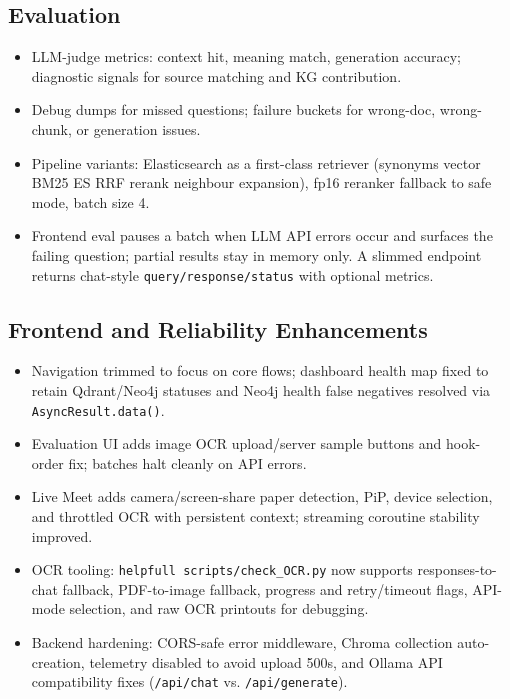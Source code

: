 \documentclass[11pt,a4paper]{article}
\begin{document}
\subsection{Evaluation}
\begin{itemize}[leftmargin=1.2cm]
    \item LLM-judge metrics: context hit, meaning match, generation accuracy; diagnostic signals for source matching and KG contribution.
    \item Debug dumps for missed questions; failure buckets for wrong-doc, wrong-chunk, or generation issues.
    \item Pipeline variants: Elasticsearch as a first-class retriever (synonyms \textrightarrow{} vector \textrightarrow{} BM25 \textrightarrow{} ES \textrightarrow{} RRF \textrightarrow{} rerank \textrightarrow{} neighbour expansion), fp16 reranker fallback to safe mode, batch size 4.
    \item Frontend eval pauses a batch when LLM API errors occur and surfaces the failing question; partial results stay in memory only. A slimmed endpoint returns chat-style \texttt{query/response/status} with optional metrics.
\end{itemize}

\subsection{Frontend and Reliability Enhancements}
\begin{itemize}[leftmargin=1.2cm]
    \item Navigation trimmed to focus on core flows; dashboard health map fixed to retain Qdrant/Neo4j statuses and Neo4j health false negatives resolved via \texttt{AsyncResult.data()}.
    \item Evaluation UI adds image OCR upload/server sample buttons and hook-order fix; batches halt cleanly on API errors.
    \item Live Meet adds camera/screen-share paper detection, PiP, device selection, and throttled OCR with persistent context; streaming coroutine stability improved.
    \item OCR tooling: \texttt{helpfull scripts/check\_OCR.py} now supports responses-to-chat fallback, PDF-to-image fallback, progress and retry/timeout flags, API-mode selection, and raw OCR printouts for debugging.
    \item Backend hardening: CORS-safe error middleware, Chroma collection auto-creation, telemetry disabled to avoid upload 500s, and Ollama API compatibility fixes (\texttt{/api/chat} vs. \texttt{/api/generate}).
\end{itemize}
\end{document}
